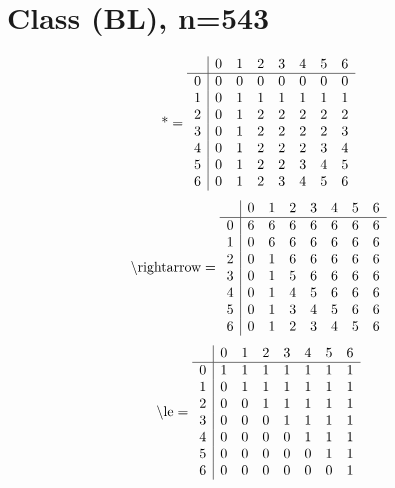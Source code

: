 \documentclass[11pt]{article}
\begin{document}
\section{Class (BL), n=543}
\[\text{*} = 
\begin{array}{r | r r r r r r r}
 & 0 & 1 & 2 & 3 & 4 & 5 & 6 \\ \hline
0 & 0 & 0 & 0 & 0 & 0 & 0 & 0 \\
1 & 0 & 1 & 1 & 1 & 1 & 1 & 1 \\
2 & 0 & 1 & 2 & 2 & 2 & 2 & 2 \\
3 & 0 & 1 & 2 & 2 & 2 & 2 & 3 \\
4 & 0 & 1 & 2 & 2 & 2 & 3 & 4 \\
5 & 0 & 1 & 2 & 2 & 3 & 4 & 5 \\
6 & 0 & 1 & 2 & 3 & 4 & 5 & 6 \\
\end{array}
\]
\[\text{\textbackslash rightarrow} = 
\begin{array}{r | r r r r r r r}
 & 0 & 1 & 2 & 3 & 4 & 5 & 6 \\ \hline
0 & 6 & 6 & 6 & 6 & 6 & 6 & 6 \\
1 & 0 & 6 & 6 & 6 & 6 & 6 & 6 \\
2 & 0 & 1 & 6 & 6 & 6 & 6 & 6 \\
3 & 0 & 1 & 5 & 6 & 6 & 6 & 6 \\
4 & 0 & 1 & 4 & 5 & 6 & 6 & 6 \\
5 & 0 & 1 & 3 & 4 & 5 & 6 & 6 \\
6 & 0 & 1 & 2 & 3 & 4 & 5 & 6 \\
\end{array}
\]
\[\text{\textbackslash le} = 
\begin{array}{r | r r r r r r r}
 & 0 & 1 & 2 & 3 & 4 & 5 & 6 \\ \hline
0 & 1 & 1 & 1 & 1 & 1 & 1 & 1 \\
1 & 0 & 1 & 1 & 1 & 1 & 1 & 1 \\
2 & 0 & 0 & 1 & 1 & 1 & 1 & 1 \\
3 & 0 & 0 & 0 & 1 & 1 & 1 & 1 \\
4 & 0 & 0 & 0 & 0 & 1 & 1 & 1 \\
5 & 0 & 0 & 0 & 0 & 0 & 1 & 1 \\
6 & 0 & 0 & 0 & 0 & 0 & 0 & 1 \\
\end{array}
\]
\end{document}
